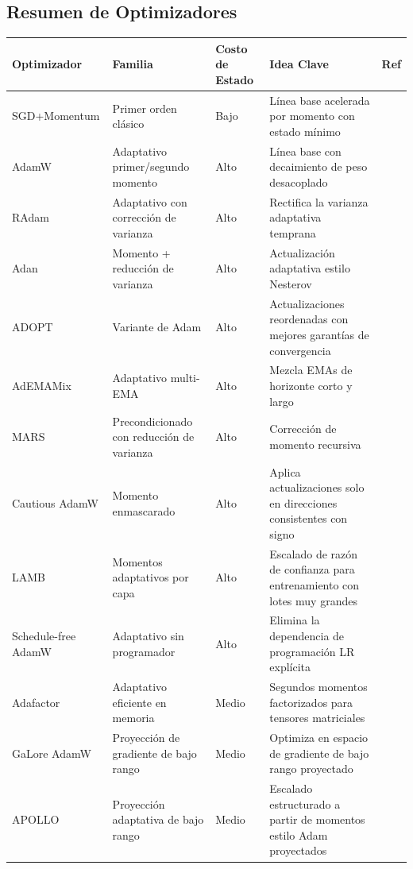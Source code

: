 \subsection{Resumen de Optimizadores}
\small
\begin{longtable}{p{2.2cm}p{2.8cm}p{2.0cm}p{5.4cm}p{1.8cm}}
\toprule
\textbf{Optimizador} & \textbf{Familia} & \textbf{Costo de Estado} & \textbf{Idea Clave} & \textbf{Ref} \\
\midrule
\endhead
SGD+Momentum & Primer orden clásico & Bajo & Línea base acelerada por momento con estado mínimo & \citep{polyak_1964} \\
AdamW & Adaptativo primer/segundo momento & Alto & Línea base con decaimiento de peso desacoplado & \citep{loshchilov_decoupled_2017} \\
RAdam & Adaptativo con corrección de varianza & Alto & Rectifica la varianza adaptativa temprana & \citep{liu_variance_2019} \\
Adan & Momento + reducción de varianza & Alto & Actualización adaptativa estilo Nesterov & \citep{xie_adan_2022} \\
ADOPT & Variante de Adam & Alto & Actualizaciones reordenadas con mejores garantías de convergencia & \citep{taniguchi_adopt_2024} \\
AdEMAMix & Adaptativo multi-EMA & Alto & Mezcla EMAs de horizonte corto y largo & \citep{pagliardini_ademamix_2024} \\
MARS & Precondicionado con reducción de varianza & Alto & Corrección de momento recursiva & \citep{yuan_mars_2024} \\
Cautious AdamW & Momento enmascarado & Alto & Aplica actualizaciones solo en direcciones consistentes con signo & \citep{liang_cautious_2024} \\
LAMB & Momentos adaptativos por capa & Alto & Escalado de razón de confianza para entrenamiento con lotes muy grandes & \citep{you_largebatch_2020} \\
Schedule-free AdamW & Adaptativo sin programador & Alto & Elimina la dependencia de programación LR explícita & \citep{defazio_road_2024} \\
Adafactor & Adaptativo eficiente en memoria & Medio & Segundos momentos factorizados para tensores matriciales & \citep{shazeer_adafactor_2018} \\
GaLore AdamW & Proyección de gradiente de bajo rango & Medio & Optimiza en espacio de gradiente de bajo rango proyectado & \citep{zhao_galore_2024} \\
APOLLO & Proyección adaptativa de bajo rango & Medio & Escalado estructurado a partir de momentos estilo Adam proyectados & \citep{zhu2025apollosgdlikememoryadamwlevel} \\

\end{longtable}
